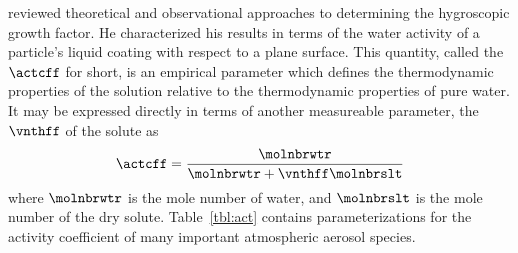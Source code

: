 \documentclass[12pt,twoside]{book}
\begin{document}
\cite{Han76} reviewed theoretical and observational approaches to
determining the hygroscopic growth factor.
He characterized his results in terms of the water activity of a
particle's liquid coating with respect to a plane surface.
This quantity, called the  $\actcff$ for
short, is an empirical parameter which defines the thermodynamic
properties of the solution relative to the thermodynamic properties of
pure water. 
It may be expressed directly in terms of another measureable
parameter, the  $\vnthff$ of the solute as 
\cite[e.g.,][]{Han76,PrK78}
\begin{equation}
\actcff = \frac{\molnbrwtr}{\molnbrwtr + \vnthff \molnbrslt }
\label{eqn:act_cff_dfn}
\end{equation}
where $\molnbrwtr$ is the mole number of water, and $\molnbrslt$ is
the mole number of the dry solute.
Table~\ref{tbl:act} contains parameterizations for the activity
coefficient of many important atmospheric aerosol species. 
\end{document}

